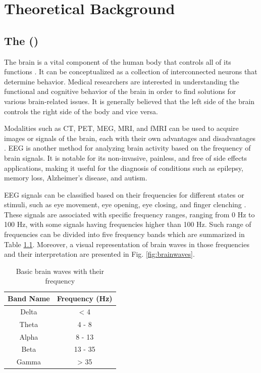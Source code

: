 \chapter{Theoretical Background}
\section{The  ()}
The brain is a vital component of the human body that controls all of its functions \cite{kumar_analysis_2012}. It can be conceptualized as a collection of interconnected neurons that determine behavior. Medical researchers are interested in understanding the functional and cognitive behavior of the brain in order to find solutions for various brain-related issues. It is generally believed that the left side of the brain controls the right side of the body and vice versa. 

Modalities such as \gls{CT}, \gls{PET}, \gls{MEG}, \gls{MRI}, and \gls{fMRI} can be used to acquire images or signals of the brain, each with their own advantages and disadvantages \cite{hajare_comparative_2021}. \gls{EEG} is another method for analyzing brain activity based on the frequency of brain signals. It is notable for its non-invasive, painless, and free of side effects applications, making it useful for the diagnosis of conditions such as epilepsy, memory loss, Alzheimer's disease, and autism. 

\gls{EEG} signals can be classified based on their frequencies for different states or stimuli, such as eye movement, eye opening, eye closing, and finger clenching \cite{kumar_analysis_2012}. These signals are associated with specific frequency ranges, ranging from 0 Hz to 100 Hz, with some signals having frequencies higher than 100 Hz. Such range of frequencies can be divided into five frequency bands which are summarized in Table \ref{tab:brain-frequency}. Moreover, a visual representation of brain waves in those frequencies and their interpretation are presented in Fig. \ref{fig:brainwaves}.


\begin{table}[ht]
    \centering
    \begin{tabular}{cc}
    \hline
    \textbf{Band Name} & \textbf{Frequency (Hz)}    \\ \hline
    Delta              & \textless{} 4              \\
    Theta              & 4 - 8                      \\
    Alpha              & 8 - 13                     \\
    Beta               & 13 - 35                    \\
    Gamma              & \textgreater{} 35          \\ \hline
    \end{tabular}
    \caption{Basic brain waves with their frequency \cite{jiang_removal_2019, abhang_chapter_2016}}
    \label{tab:brain-frequency}
\end{table}

